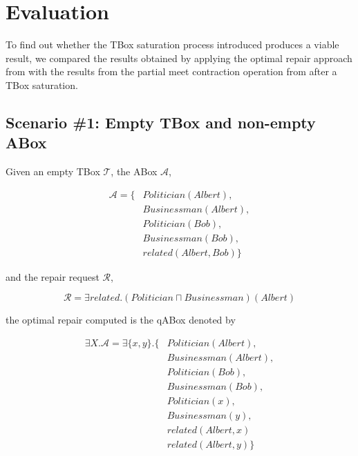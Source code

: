 
\chapter{Evaluation}
\label{chap:evaluation}

To find out whether the TBox saturation process introduced produces a viable result, we compared the results obtained by applying the optimal repair approach from \citep{Baader-CADE2021} with the results from the partial meet contraction operation from \citep{Matos2021} after a TBox saturation.

\section{Scenario \#1: Empty TBox and non-empty ABox}
\label{sec:scenario-1}

Given an empty TBox $\mathcal{T}$, the ABox $\mathcal{A}$,

\begin{equation*}
    \begin{aligned}
        \mathcal{A} = \{ & Politician(Albert),  \\
                         & Businessman(Albert), \\
                         & Politician(Bob),     \\
                         & Businessman(Bob),    \\
                         & related(Albert, Bob) \}
    \end{aligned}
\end{equation*}

and the repair request $\mathcal{R}$,

$$\mathcal{R} = {\exists related.(Politician \sqcap Businessman)(Albert)}$$

the optimal repair computed is the qABox denoted by

\begin{equation*}
    \begin{aligned}
        \exists X.\mathcal{A} = \exists \{ x, y \}.\{ & Politician(Albert),  \\
                                                      & Businessman(Albert), \\
                                                      & Politician(Bob),     \\
                                                      & Businessman(Bob),    \\ 
                                                      & Politician(x),       \\
                                                      & Businessman(y),      \\
                                                      & related(Albert, x)   \\
                                                      & related(Albert, y)   \}
    \end{aligned}
\end{equation*}

